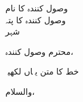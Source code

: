 \documentclass{letter}
\begin{document}
\begin{letter}{وصول کنندہ کا نام \\ وصول کنندہ کا پتہ \\ شہر}
\opening{محترم وصول کنندہ،}

خط کا متن یہاں لکھیںؔ

\closing{والسلام،}

\end{letter}
\end{document}
